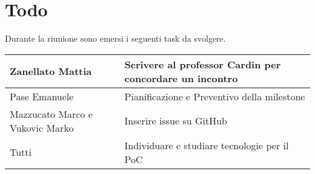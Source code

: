 \section{Todo}
Durante la riunione sono emersi i seguenti task da svolgere.

\begin{center}
  \begin{tabular}{|p{5cm}|p{7cm}|}
    \hline
    Zanellato Mattia & Scrivere al professor Cardin per concordare un incontro \\ \hline
    Pase Emanuele & Pianificazione e Preventivo della milestone \\ \hline
    Mazzucato Marco e Vukovic Marko & Inserire issue su GitHub \\ \hline
    Tutti & Individuare e studiare tecnologie per il PoC \\ \hline
  \end{tabular}
\end{center}
